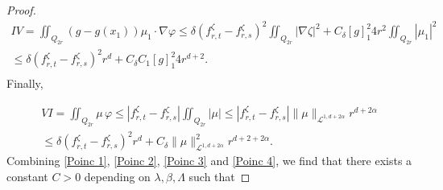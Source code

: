 \documentclass[reqno,12pt,twoside]{amsart}
\numberwithin{equation}{section} \numberwithin{theorem}{section}
\numberwithin{proposition}{section} \numberwithin{lemma}{section}
\numberwithin{corollary}{section}
\numberwithin{definition}{section} \numberwithin{remark}{section}
\begin{document}
\begin{proof}
\begin{multline}\label{Poinc 4}
IV = \iint_{Q_{2r}} (g-g(x_1)) \mu_1 \cdot \nabla \varphi\leqslant\delta (f_{r,t}^\zeta - f_{r,s}^\zeta)^2\iint_{Q_{2r}}|\nabla \zeta|^2 + C_\delta [g]_1^2 4r^2\iint_{Q_{2r}}  |\mu_1|^2\\
\leqslant \delta (f_{r,t}^\zeta - f_{r,s}^\zeta)^2 r^d + C_\delta C_1 [g]_1^2 4r^{d+2}. \\  
\end{multline}
Finally, 

\begin{multline}\label{Poinc 6}
VI =\iint_{Q_{2r}}\mu \,\varphi \leqslant |f_{r,t}^\zeta - f_{r,s}^\zeta|\iint_{Q_{2r}}|\mu| \leqslant |f_{r,t}^\zeta - f_{r,s}^\zeta| \|\mu\|_{\mathcal{L}^{1,d+2\alpha}} r^{d+2\alpha}\\ \leqslant \delta (f_{r,t}^\zeta - f_{r,s}^\zeta)^2r^d +C_\delta  \|\mu\|_{\mathcal{L}^{1,d+2\alpha}}^2r^{d+2+2\alpha}. 
\end{multline}
Combining \eqref{Poinc 1}, \eqref{Poinc 2}, \eqref{Poinc 3} and \eqref{Poinc 4}, we find that there exists a constant $C>0$ depending on $\lambda, \beta, \Lambda$ such that


\end{proof}
\end{document}
